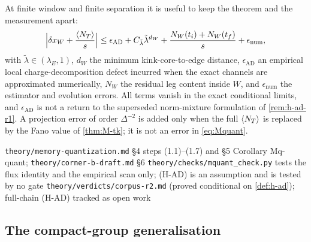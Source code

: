 \begin{remark}
\label{rem:error-budget}
At finite window and finite separation it is useful to keep the theorem and the
measurement apart:
\begin{equation}
  \Bigl|\delta x_W+\frac{\langle N_T\rangle}{s}\Bigr|
  \le\epsilon_{\mathrm{AD}}
   +C_{\tilde\lambda}\tilde\lambda^{d_W}
   +\frac{N_W(t_i)+N_W(t_f)}{s}
   +\epsilon_{\mathrm{num}},
  \label{eq:budget}
\end{equation}
with $\tilde\lambda\in(\lambda_E,1)$, $d_W$ the minimum kink-core-to-edge
distance, $\epsilon_{\mathrm{AD}}$ an empirical local charge-decomposition
defect incurred when the exact channels are approximated numerically, $N_W$ the
residual leg content inside $W$, and $\epsilon_{\mathrm{num}}$ the estimator and
evolution errors. All terms vanish in the exact conditional limits, and
$\epsilon_{\mathrm{AD}}$ is not a return to the superseded norm-mixture
formulation of \cref{rem:h-ad-r1}. A projection error of order $\Delta^{-2}$ is
added only when the full $\langle N_T\rangle$ is replaced by the Fano value of
\cref{thm:M-tk}; it is not an error in \eqref{eq:Mquant}.
\end{remark}

%
{\texttt{theory/memory-quantization.md} \S4 steps (1.1)--(1.7) and \S5
 Corollary Mq-quant; \texttt{theory/corner-b-draft.md} \S6}%
{\texttt{theory/checks/mquant\_check.py} tests the flux identity and the
 empirical scan only; (H-AD) is an assumption and is tested by no gate}%
{\texttt{theory/verdicts/corpus-r2.md} (proved conditional on
 \cref{def:h-ad}); full-chain (H-AD) tracked as open work}

\subsection{The compact-group generalisation}

